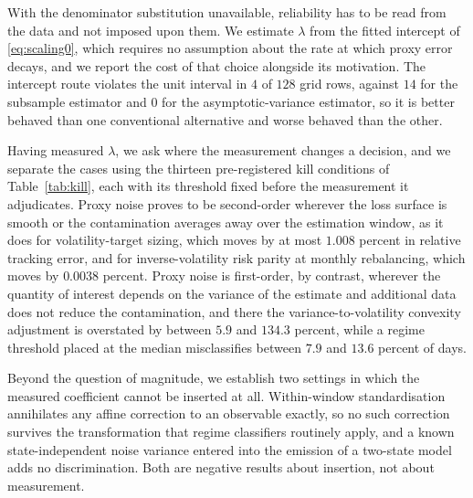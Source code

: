 With the denominator substitution unavailable, reliability has to be read from
the data and not imposed upon them. We estimate $\lambda$ from the fitted
intercept of \eqref{eq:scaling0}, which requires no assumption about the rate at
which proxy error decays, and we report the cost of that choice alongside its
motivation. The intercept route violates the unit interval in $4$ of $128$ grid %
rows, against $14$ for the subsample estimator and $0$ for the %
asymptotic-variance estimator, so it is better behaved than one conventional
alternative and worse behaved than the other.

Having measured $\lambda$, we ask where the measurement changes a decision, and
we separate the cases using the thirteen pre-registered kill conditions of
Table~\ref{tab:kill}, each with its threshold fixed before the measurement it
adjudicates. Proxy noise proves to
be second-order wherever the loss surface is smooth or the contamination averages
away over the estimation window, as it does for volatility-target sizing, which
moves by at most $1.008$ percent in relative tracking error, and for
inverse-volatility risk parity at monthly rebalancing, which moves by $0.0038$
percent. Proxy noise is first-order, by contrast, wherever the quantity of
interest depends on the variance of the estimate and additional data does not
reduce the contamination, and there the variance-to-volatility convexity
adjustment is overstated by between $5.9$ and $134.3$ percent, while a regime %
threshold placed at the median misclassifies between $7.9$ and $13.6$ percent of %
days.

Beyond the question of magnitude, we establish two settings in which the measured
coefficient cannot be inserted at all. Within-window standardisation annihilates
any affine correction to an observable exactly, so no such correction survives
the transformation that regime classifiers routinely apply, and a known
state-independent noise variance entered into the emission of a two-state model
adds no discrimination. Both are negative results about insertion, not about
measurement.
